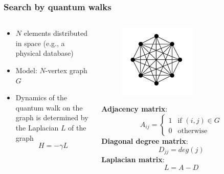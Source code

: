 \documentclass{beamer}
\newcommand{\bb}[1]{\textbf{\textcolor{darkish_blue}{#1}}}
\begin{document}


\begin{frame}
\frametitle{Search by quantum walks}

\begin{columns}

	\begin{column}[T]{0.5\textwidth}
		\begin{itemize}
			\item $N$ elements distributed in space (e.g., a physical database)
			\item Model: $N$-vertex graph $G$
			\item Dynamics of the quantum walk on the graph is determined by the Laplacian $L$ of the graph $$H=-\gamma L$$
		\end{itemize}
	\end{column}

	\begin{column}[T]{0.4\textwidth}
	\vspace{-0.2cm}
	\begin{tcolorbox}[width=5.2cm, colframe=darkblue, colback=white, halign=center, left=1pt, right=1pt, top=1pt, bottom=3pt]
		\footnotesize
		\begin{figure}
			
			\includegraphics[width=0.6\textwidth]{complete_graph.png}
		\end{figure}
		\vspace{-0.7cm}
		\bb{Adjacency matrix}:
		\begin{equation*}
			A_{ij} = \begin{cases} 1 & \mbox{if }(i,j)\in G \\ 0 & \mbox{otherwise} \end{cases}
		\end{equation*}
		\bb{Diagonal degree matrix}:
		\begin{equation*}
			D_{jj}= deg(j)
		\end{equation*}
		\bb{Laplacian matrix}:
		\begin{equation*}
			L = A-D
		\end{equation*}
	\end{tcolorbox}
	\end{column}

\end{columns}
\end{frame}
\end{document}
